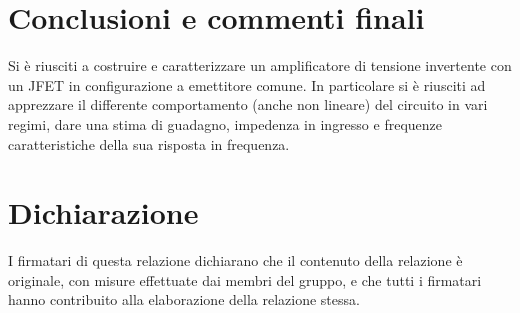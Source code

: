 \documentclass[10pt, a4paper, italian]{article}
\begin{document}
\section*{Conclusioni e commenti finali}
Si è riusciti a costruire e caratterizzare un amplificatore di tensione
invertente con un JFET in configurazione a emettitore comune. In particolare
si è riusciti ad apprezzare il differente comportamento (anche non lineare)
del circuito in vari regimi, dare una stima di guadagno, impedenza in
ingresso e frequenze caratteristiche della sua risposta in frequenza.

\section*{Dichiarazione}
I firmatari di questa relazione dichiarano che il contenuto della relazione \`e
originale, con misure effettuate dai membri del gruppo, e che tutti i firmatari
hanno contribuito alla elaborazione della relazione stessa.
\end{document}
